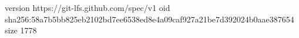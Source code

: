version https://git-lfs.github.com/spec/v1
oid sha256:58a7b5bb825eb2102bd7ee6538ed8e4a09caf927a21be7d392024b0aae387654
size 1778
